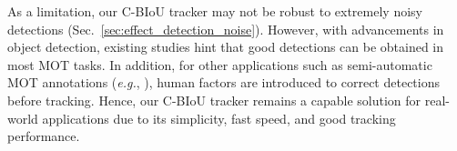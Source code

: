 \documentclass[journal]{IEEEtran}
\newcommand{\eg}{{\it e.g.}}
\begin{document}
As a limitation, our C-BIoU tracker may not be robust to extremely noisy detections (Sec.~\ref{sec:effect_detection_noise}). However, with advancements in object detection,  existing studies hint that good detections can be obtained in most MOT tasks. In addition, for other applications such as semi-automatic MOT annotations (\eg, \cite{fernandez2019semi,voigtlaender2019mots}), human factors are introduced to correct detections before tracking. 
Hence, our C-BIoU tracker remains a capable solution for real-world applications due to its simplicity, fast speed, and good tracking performance.





{\small


}
\end{document}
